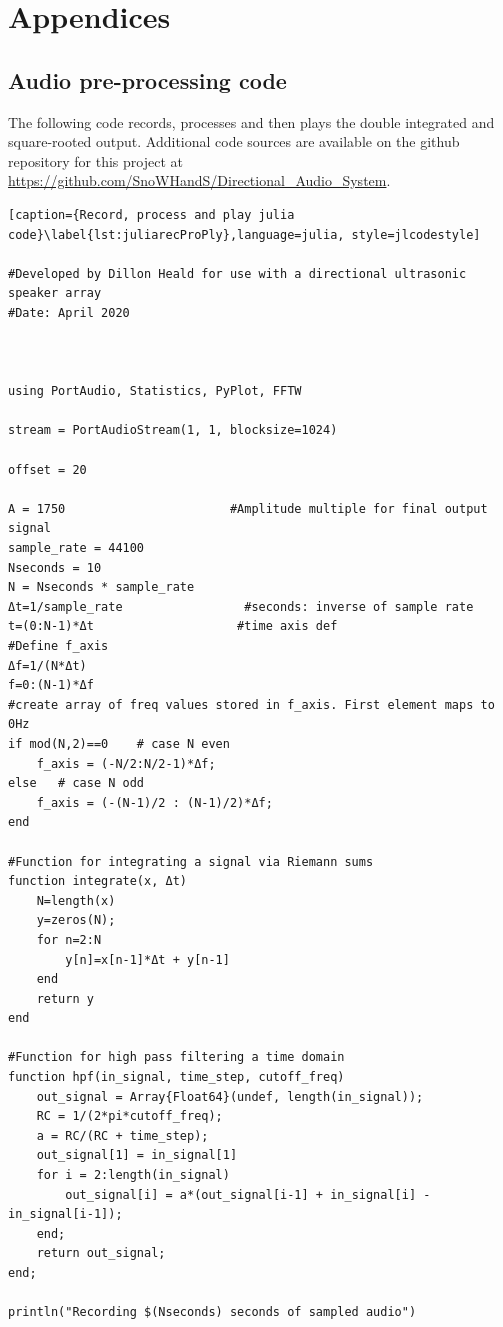 \section{Appendices}
\begin{appendices}
\section{Audio pre-processing code}


The following code records, processes and then plays the double integrated and square-rooted output. Additional code sources are available on the github repository for this project at \url{https://github.com/SnoWHandS/Directional_Audio_System}.

\begin{lstlisting}[caption={Record, process and play julia code}\label{lst:juliarecProPly},language=julia, style=jlcodestyle]

#Developed by Dillon Heald for use with a directional ultrasonic speaker array
#Date: April 2020



using PortAudio, Statistics, PyPlot, FFTW

stream = PortAudioStream(1, 1, blocksize=1024)

offset = 20

A = 1750                       #Amplitude multiple for final output signal
sample_rate = 44100
Nseconds = 10
N = Nseconds * sample_rate
Δt=1/sample_rate                 #seconds: inverse of sample rate
t=(0:N-1)*Δt                    #time axis def
#Define f_axis
Δf=1/(N*Δt)
f=0:(N-1)*Δf
#create array of freq values stored in f_axis. First element maps to 0Hz
if mod(N,2)==0    # case N even
    f_axis = (-N/2:N/2-1)*Δf;    
else   # case N odd
    f_axis = (-(N-1)/2 : (N-1)/2)*Δf; 
end

#Function for integrating a signal via Riemann sums
function integrate(x, Δt)
    N=length(x)
    y=zeros(N);
    for n=2:N
        y[n]=x[n-1]*Δt + y[n-1]
    end
    return y
end

#Function for high pass filtering a time domain
function hpf(in_signal, time_step, cutoff_freq)
    out_signal = Array{Float64}(undef, length(in_signal));
    RC = 1/(2*pi*cutoff_freq);
    a = RC/(RC + time_step);
    out_signal[1] = in_signal[1]
    for i = 2:length(in_signal)
        out_signal[i] = a*(out_signal[i-1] + in_signal[i] - in_signal[i-1]);
    end;
    return out_signal;
end;

println("Recording $(Nseconds) seconds of sampled audio")


\end{lstlisting}
\end{appendices}
